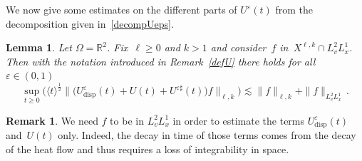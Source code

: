 \documentclass[11pt]{article}
\newtheorem{lemm}[theo]{Lemma}
\theoremstyle{definition}
\newtheorem{rema}[theo]{Remark}
\numberwithin{equation}{section}
\numberwithin{figure}{section}
\numberwithin{table}{section}
\newcommand*\R {\mathbb{R}}
\newcommand*\eps{{\varepsilon}}
\DeclareMathOperator{\disp}{disp}
\begin{document}
We now give some estimates on the different parts of $U^\eps(t)$ from the decomposition given in~\eqref{decompUeps}.

\begin{lemm}\label{lem:Uepsdisp}
Let $\Omega = \R^2$. Fix~$\ell \ge0$ and ${k>1}$ and consider~$f$ in~$X^{\ell,k} \cap L^{2}_v L^1_x$. Then with the notation introduced in Remark~\ref{defU} there holds for all $\eps \in (0,1)$
\[
\sup_{t \ge 0} \bigg(\langle t \rangle^{\frac12} \big\|\big(U^\eps_{\disp}(t) +U(t) + U^{\eps \sharp}(t)\big) f\big \|_{\ell,k}\bigg) \lesssim \|f\|_{\ell,k} + \|f\|_{L^{2}_v L^1_x} \,.
\]
\end{lemm}

\begin{rema}
We need $f$ to be in $L^{2}_v L^1_x$ in order to estimate the terms $U^\eps_{\disp}(t)$ and~$U(t)$ only. Indeed, the decay in time of those terms comes from the decay of the heat flow and thus requires a loss of integrability in space.
\end{rema}
\end{document}
